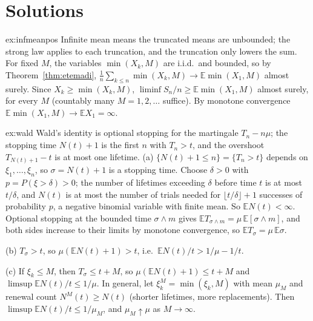 \section{Solutions}

\begin{solution}{ex:infmeanpos}
\idea Infinite mean means the truncated means are unbounded; the strong law applies to each truncation, and the truncation only lowers the sum.
\writeup For fixed $M$, the variables $\min(X_k,M)$ are i.i.d.\ and bounded, so by Theorem~\ref{thm:etemadi}, $\frac1n\sum_{k\le n}\min(X_k,M)\to\mathbb E\min(X_1,M)$
almost surely. Since $X_k\ge\min(X_k,M)$, $\liminf S_n/n\ge\mathbb E\min(X_1,M)$ almost surely, for every $M$ (countably many $M=1,2,\dots$ suffice). By monotone
convergence $\mathbb E\min(X_1,M)\to\mathbb E X_1=\infty$.
\end{solution}

\begin{solution}{ex:wald}
\idea Wald's identity is optional stopping for the martingale $T_n-n\mu$; the stopping time $N(t)+1$ is the first $n$ with $T_n>t$, and the overshoot
$T_{N(t)+1}-t$ is at most one lifetime.
\writeup (a) $\{N(t)+1\le n\}=\{T_n>t\}$ depends on $\xi_1,\dots,\xi_n$, so $\sigma=N(t)+1$ is a stopping time. Choose $\delta>0$ with $p=P(\xi>\delta)>0$; the
number of lifetimes exceeding $\delta$ before time $t$ is at most $t/\delta$, and $N(t)$ is at most the number of trials needed for $\lfloor t/\delta\rfloor+1$
successes of probability $p$, a negative binomial variable with finite mean. So $\mathbb E N(t)<\infty$. Optional stopping at the bounded time $\sigma\wedge m$ gives
$\mathbb E T_{\sigma\wedge m}=\mu\,\mathbb E[\sigma\wedge m]$, and both sides increase to their limits by monotone convergence, so $\mathbb E T_\sigma=\mu\,\mathbb E\sigma$.

(b) $T_\sigma>t$, so $\mu(\mathbb E N(t)+1)>t$, i.e.\ $\mathbb E N(t)/t>1/\mu-1/t$.

(c) If $\xi_k\le M$, then $T_\sigma\le t+M$, so $\mu(\mathbb E N(t)+1)\le t+M$ and $\limsup\mathbb E N(t)/t\le1/\mu$. In general, let $\xi_k^M=\min(\xi_k,M)$ with mean
$\mu_M$ and renewal count $N^M(t)\ge N(t)$ (shorter lifetimes, more replacements). Then $\limsup\mathbb E N(t)/t\le1/\mu_M$, and $\mu_M\uparrow\mu$ as $M\to\infty$.
\end{solution}

